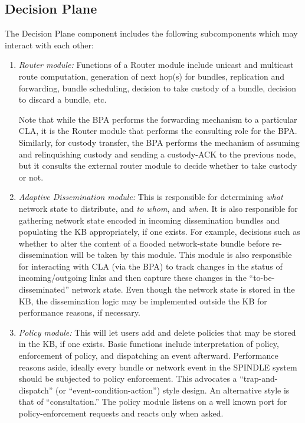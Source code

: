 \documentclass[11pt]{article}
\begin{document}
\subsection{Decision Plane} \label{sec:dp}

The Decision Plane component includes the following subcomponents which may
interact with each other:

\begin{enumerate}

\item {\it Router module:} Functions of a Router module include unicast and
multicast route computation, generation of next hop(s) for bundles, replication
and forwarding, bundle scheduling, decision to take custody of a bundle,
decision to discard a bundle, etc. 

Note that while the BPA performs the forwarding mechanism to a particular CLA,
it is the Router module that performs the consulting role for the BPA.  Similarly,
for custody transfer, the BPA performs the mechanism of assuming and
relinquishing custody and sending a custody-ACK to the previous node, but it
consults the external router module to decide whether to take custody or not.

\item {\it Adaptive Dissemination module:} This is responsible for determining
{\it what} network state to distribute, and {\it to whom}, and {\it when}. It
is also responsible for gathering network state encoded in incoming
dissemination bundles and populating the KB appropriately, if one exists. For
example, decisions such as whether to alter the content of a flooded
network-state bundle before re-dissemination will be taken by this module. This
module is also responsible for interacting with CLA (via the BPA) to track
changes in the status of incoming/outgoing links and then capture these changes
in the ``to-be-disseminated'' network state.  Even though the network state is
stored in the KB, the dissemination logic may be implemented outside the KB for
performance reasons, if necessary.

\item {\it Policy module:} This will let users add and delete policies that may
be stored in the KB, if one exists. Basic functions include interpretation of
policy, enforcement of policy, and dispatching an event afterward. Performance
reasons aside, ideally every bundle or network event in the SPINDLE system
should be subjected to policy enforcement. This advocates a
``trap-and-dispatch'' (or ``event-condition-action'') style design.  An 
alternative style is that of ``consultation.'' The policy module listens on 
a well known port for policy-enforcement requests
and reacts only when asked.


\end{enumerate}
\end{document}
